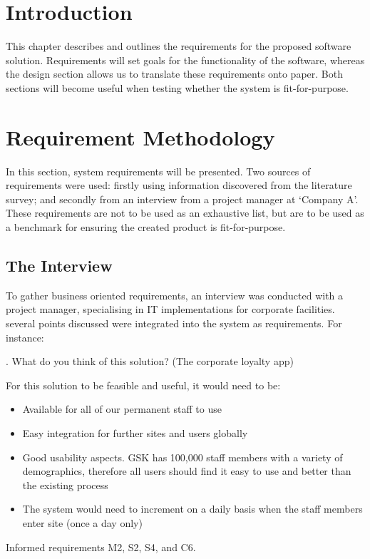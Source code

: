 \section{Introduction}
This chapter describes and outlines the requirements for the proposed software solution. Requirements will set goals for the functionality of the software, whereas the design section allows us to translate these requirements onto paper. Both sections will become useful when testing whether the system is fit-for-purpose.

\section{Requirement Methodology}
In this section, system requirements will be presented. Two sources of requirements were used: firstly using information discovered from the literature survey; and secondly from an interview from a project manager at `Company A'. These requirements are not to be used as an exhaustive list, but are to be used as a benchmark for ensuring the created product is fit-for-purpose.

\subsection{The Interview}
To gather business oriented requirements, an interview was conducted with a project manager, specialising in IT implementations for corporate facilities. several points discussed were integrated into the system as requirements. For instance:

{. What do you think of this solution? (The corporate loyalty app)

For this solution to be feasible and useful, it would need to be:

\begin{itemize}
\item Available for all of our permanent staff to use
\item Easy integration for further sites and users globally
\item Good usability aspects. GSK has 100,000 staff members with a variety of demographics, therefore all users should find it easy to use and better than the existing process
\item The system would need to increment on a daily basis when the staff members enter site (once a day only)
\end{itemize}
}

Informed requirements M2, S2, S4, and C6.

